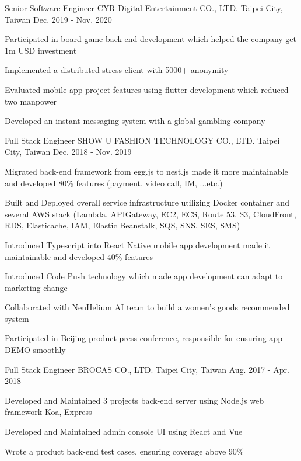 \begin{cventries}
  \cventry
    {Senior Software Engineer} %
    {CYR Digital Entertainment CO., LTD.} %
    {Taipei City, Taiwan} %
    {Dec. 2019 - Nov. 2020} %
    {
      \begin{cvitems} %
        \item {Participated in board game back-end development which helped the company get 1m USD investment}
        \item {Implemented a distributed stress client with 5000+ anonymity}
        \item {Evaluated mobile app project features using flutter development which reduced two manpower}
        \item {Developed an instant messaging system with a global gambling company}
      \end{cvitems}
    }

  \cventry
    {Full Stack Engineer} %
    {SHOW U FASHION TECHNOLOGY CO., LTD.} %
    {Taipei City, Taiwan} %
    {Dec. 2018 - Nov. 2019} %
    {
      \begin{cvitems} %
        \item {Migrated back-end framework from egg.js to nest.js made it more maintainable and developed 80\% features (payment, video call, IM, ...etc.)}
        \item {Built and Deployed overall service infrastructure utilizing Docker container and several AWS stack (Lambda, APIGateway, EC2, ECS, Route 53, S3, CloudFront, RDS, Elasticache, IAM, Elastic Beanstalk, SQS, SNS, SES, SMS)}
        \item {Introduced Typescript into React Native mobile app development made it maintainable and developed 40\% features }
        \item {Introduced Code Push technology which made app development can adapt to marketing change}
        \item {Collaborated with NeuHelium AI team to build a women's goods recommended system}
        \item {Participated in Beijing product press conference, responsible for ensuring app DEMO smoothly}
      \end{cvitems}
    }

  \cventry
    {Full Stack Engineer} %
    {BROCAS CO., LTD.} %
    {Taipei City, Taiwan} %
    {Aug. 2017 - Apr. 2018} %
    {
      \begin{cvitems} %
        \item {Developed and Maintained 3 projects back-end server using Node.js web framework Koa, Express}
        \item {Developed and Maintained admin console UI using React and Vue}
        \item {Wrote a product back-end test cases, ensuring coverage above 90\%}
      \end{cvitems}
    }


\end{cventries}
